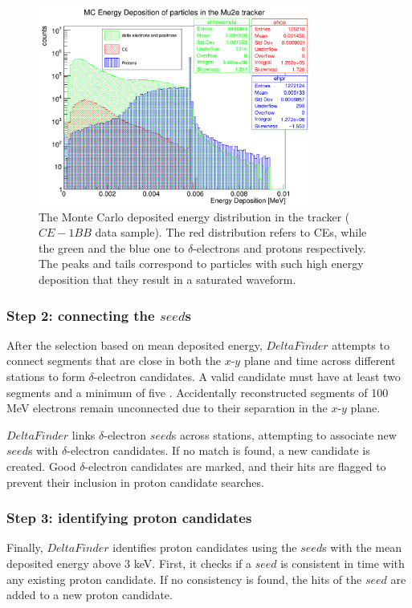 \begin{figure}[!h]
    \centering
    \includegraphics[width =0.8\textwidth]{figures/png/Screenshot_20240729_151910.png}
\caption[Monte Carlo deposited energy 
distribution in the tracker.]{
   The Monte Carlo deposited energy 
   distribution in the tracker ($CE-1BB$ data sample).  
   The red distribution refers to 
   CEs, while the 
   green and the blue one to $\delta$-electrons 
   and protons respectively. 
   The peaks and tails correspond to 
   particles with such high energy 
   deposition that they result in a 
   saturated waveform.
}
   \label{fig:energydeposited}
\end{figure}
\subsubsection{Step 2: connecting the $seed$s}
After the selection based on mean deposited energy, 
$DeltaFinder$ attempts to connect segments that 
are close in both the $x$-$y$ plane and time 
across different stations to form $\delta$-electron 
candidates. A valid candidate must have at 
least two segments and a minimum of five . 
Accidentally reconstructed segments of 100 MeV electrons  
remain unconnected due 
to their separation in the $x$-$y$ plane. 

$DeltaFinder$ links $\delta$-electron $seed$s 
across stations, attempting to associate new $seed$s 
with  $\delta$-electron candidates.
If no match is 
found, a new candidate is created. Good $\delta$-electron 
candidates are marked, and their hits are 
flagged to prevent their inclusion in proton candidate searches.

\subsubsection{Step 3: identifying proton candidates}
Finally, $DeltaFinder$ identifies proton candidates 
using the $seed$s with the mean deposited energy above 3 keV. First, it checks 
if a $seed$ is consistent in time with any existing 
proton candidate. If no consistency is found, 
the hits of the $seed$ are added to a new proton candidate.



